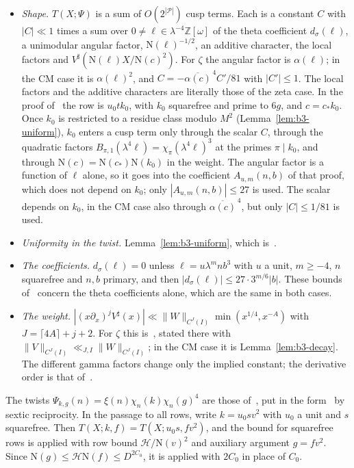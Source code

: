\documentclass[11pt]{article}
\numberwithin{equation}{section}
\newcommand{\OO}{\mathbb Z[\omega]}
\newcommand{\N}{\mathrm N}
\begin{document}
\begin{itemize}
\item \emph{Shape.} $T(X;\Psi)$ is a sum of $O(2^{|\mathcal P|})$ cusp terms. Each is a constant $C$
 with $|C|\ll1$ times a sum over $0\ne\ell\in\lambda^{-4}\OO$ of the theta coefficient $d_\sigma(\ell)$,
 a unimodular angular factor, $\N(\ell)^{-1/2}$, an additive character, the local factors and
 $V^\sharp(\N(\ell)X/\N(c)^2)$. For $\zeta$ the angular factor is $\alpha(\ell)$; in the CM case it is
 $\alpha(\ell)^2$, and $C=-\overline{\alpha(c)}^{\,4}C'/81$ with $|C'|\le1$. The local factors and the
 additive characters are literally those of the zeta case. In the proof of~\cite[Lemma~6.6]{OAI1112}
 the row is $u_0tk_0$, with $k_0$ squarefree and prime to $6g$, and $c=c_*k_0$. Once $k_0$ is restricted
 to a residue class modulo $M^2$ (Lemma~\ref{lem:b3-uniform}), $k_0$ enters a cusp term only through the
 scalar $C$, through the quadratic factors $B_{\pi,1}(\lambda^4\ell)=\chi_\pi(\lambda^4\ell)^3$ at the
 primes $\pi\mid k_0$, and through $\N(c)=\N(c_*)\N(k_0)$ in the weight. The angular factor is a function
 of $\ell$ alone, so it goes into the coefficient $A_{u,m}(n,b)$ of that proof, which does not depend on
 $k_0$; only $|A_{u,m}(n,b)|\le27$ is used. The scalar depends on $k_0$, in the CM case also through
 $\overline{\alpha(c)}^{\,4}$, but only $|C|\le1/81$ is used.
\item \emph{Uniformity in the twist.} Lemma~\ref{lem:b3-uniform}, which
 is~\cite[Lemma~6.3]{OAI1112}.
\item \emph{The coefficients.} $d_\sigma(\ell)=0$ unless $\ell=u\lambda^mnb^3$ with $u$ a unit, $m\ge-4$,
 $n$ squarefree and $n,b$ primary, and then $|d_\sigma(\ell)|\le27\cdot3^{m/6}|b|$. These bounds
 of~\cite[Lemma~6.4]{OAI1112} concern the theta coefficients alone, which are the same in both cases.
\item \emph{The weight.} $|(x\partial_x)^jV^\sharp(x)|\ll\|W\|_{C^J(I)}\min(x^{1/4},x^{-A})$ with
 $J=\lceil4A\rceil+j+2$. For $\zeta$ this is~\cite[Lemma~6.4]{OAI1112}, stated there with
 $\|V\|_{C^J(I)}\ll_{J,I}\|W\|_{C^J(I)}$; in the CM case it is Lemma~\ref{lem:b3-decay}. The different
 gamma factors change only the implied constant; the derivative order is that of~\cite[(A.20)]{OAI1112}.
\end{itemize}
The twists $\Psi_{k,g}(n)=\xi(n)\chi_n(k)\chi_n(g)^4$ are those of~\cite[Section~6.4]{OAI1112}, put in the
form~\cite[(6.17)]{OAI1112} by sextic reciprocity. In the passage
to all rows, write $k=u_0sv^2$ with $u_0$ a unit and $s$ squarefree. Then
$T(X;k,f)=T(X;u_0s,fv^2)$, and the bound for squarefree rows is applied with row bound
$\mathcal H/\N(v)^2$ and auxiliary argument $g=fv^2$. Since $\N(g)\le\mathcal H\N(f)\le D^{2C_0}$, it is
applied with $2C_0$ in place of $C_0$.
\end{document}
